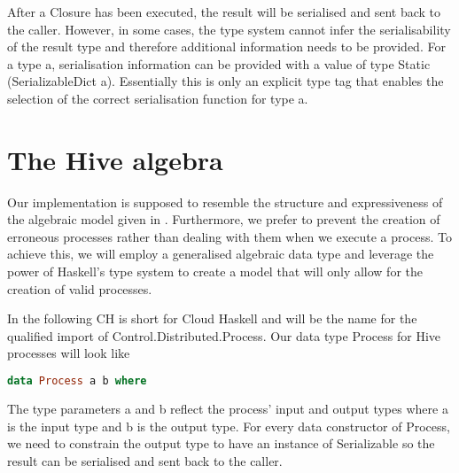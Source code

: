 After a \textsf{Closure} has been executed, the result will be serialised and sent back to the caller. However, in some cases, the type system cannot infer the serialisability of the result type and therefore additional information needs to be provided. For a type \textsf{a}, serialisation information can be provided with a value of type \textsf{Static (SerializableDict a)}. Essentially this is only an explicit type tag that enables the selection of the correct serialisation function for type \textsf{a}.

\section{The Hive algebra}
Our implementation is supposed to resemble the structure and expressiveness of the algebraic model given in . Furthermore, we prefer to prevent the creation of erroneous processes rather than dealing with them when we execute a process. To achieve this, we will employ a generalised algebraic data type and leverage the power of Haskell's type system to create a model that will only allow for the creation of valid processes.

In the following \textsf{CH} is short for Cloud Haskell and will be the name for the qualified import of \textsf{Control.Distributed.Process}. Our data type \textsf{Process} for Hive processes will look like
\begin{lstlisting}[language=Haskell]
data Process a b where 
\end{lstlisting}
The type parameters \textsf{a} and \textsf{b} reflect the process' input and output types where \textsf{a} is the input type and \textsf{b} is the output type. For every data constructor of \textsf{Process}, we need to constrain the output type to have an instance of \textsf{Serializable} so the result can be serialised and sent back to the caller.

